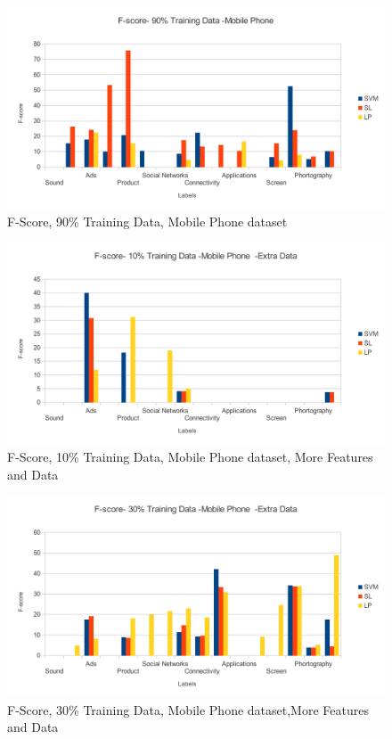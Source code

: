 \documentclass[4pt,a4paper,twocolumn]{article}
\begin{document}
\begin{figure}[]
  
  \centering
    \includegraphics[scale=0.7]{graphics/sony/halfData/fscore-90-sony}
    \caption{F-Score, 90\% Training Data, Mobile Phone dataset}
   \label{fig:sony_90_fscore_half}  
\end{figure}




\begin{figure}[]
  
  \centering
    \includegraphics[scale=0.7]{graphics/sony/moreData/fscore-10-sony}
    \caption{F-Score, 10\% Training Data, Mobile Phone dataset, More Features and Data}
   \label{fig:sony_10_fscore_more}  
\end{figure}

\begin{figure}[]
  
  \centering
    \includegraphics[scale=0.7]{graphics/sony/moreData/fscore-30-sony}
    \caption{F-Score, 30\% Training Data, Mobile Phone dataset,More Features and Data}
   \label{fig:sony_30_fscore_more}  
\end{figure}
\end{document}
